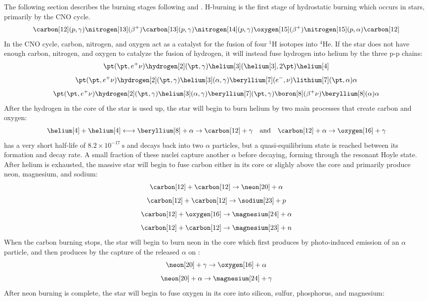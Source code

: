 The following section describes the burning stages following \citet{woosleyEvolutionExplosionMassive2002} and \citet{iliadisNuclearPhysicsStars2015}.
H-burning is the first stage of hydrostatic burning which occurs in stars, primarily by the CNO cycle.
\[
    \carbon[12](p,\gamma)\nitrogen[13](\beta^+)\carbon[13](p,\gamma)\nitrogen[14](p,\gamma)\oxygen[15](\beta^+)\nitrogen[15](p,\alpha)\carbon[12]
\]
In the CNO cycle, carbon, nitrogen, and oxygen act as a catalyst for the fusion of four $^{1}\mathrm{H}$ isotopes into $^{4}\mathrm{He}$. 
If the star does not have enough carbon, nitrogen, and oxygen to catalyze the fusion of hydrogen, it will instead fuse hydrogen into helium by the three p-p chains:
\[
    \pt(\pt,e^+\nu)\hydrogen[2](\pt,\gamma)\helium[3](\helium[3],2\pt)\helium[4]
\]
\[
    \pt(\pt,e^+\nu)\hydrogen[2](\pt,\gamma)\helium[3](\alpha,\gamma)\beryllium[7](e^-,\nu)\lithium[7](\pt,\alpha)\alpha
\]
\[
    \pt(\pt,e^+\nu)\hydrogen[2](\pt,\gamma)\helium[3](\alpha,\gamma)\beryllium[7](\pt,\gamma)\boron[8](\beta^+\nu)\beryllium[8](\alpha)\alpha
\]
After the hydrogen in the core of the star is used up, the star will begin to burn helium by two main processes that create carbon and oxygen:
\[
    \helium[4]+\helium[4]\longleftrightarrow\beryllium[8] + \alpha\rightarrow\carbon[12]+\gamma \quad \mathrm{and} \quad \carbon[12]+\alpha\rightarrow\oxygen[16]+\gamma
\]
\beryllium[8] has a very short half-life of $8.2\times10^{-17}~\mathrm{s}$ and decays back into two $\alpha$ particles, but a quasi-equilibrium state is reached between its formation and decay rate.
A small fraction of these \beryllium[8] nuclei capture another $\alpha$ before decaying, forming \carbon[12] through the resonant Hoyle state.
After helium is exhausted, the massive star will begin to fuse carbon either in its core or slighly above the core and primarily produce neon, magnesium, and sodium:
\[
    \carbon[12] + \carbon[12] \rightarrow \neon[20] + \alpha
\]
\[
    \carbon[12] + \carbon[12] \rightarrow \sodium[23] + p
\]
\[
    \carbon[12] + \oxygen[16] \rightarrow \magnesium[24] + \alpha
\]
\[
    \carbon[12] + \carbon[12] \rightarrow \magnesium[23] + n
\]
When the carbon burning stops, the star will begin to burn neon in the core which first produces \oxygen[16] by photo-induced emission of an $\alpha$ particle, and then produces \magnesium[24] by the capture of the released $\alpha$ on \neon[20]:
\[
    \neon[20]+\gamma\rightarrow\oxygen[16]+\alpha
\]
\[
    \neon[20]+\alpha\rightarrow\magnesium[24]+\gamma
\]
After neon burning is complete, the star will begin to fuse oxygen in its core into silicon, sulfur, phosphorus, and magnesium:
